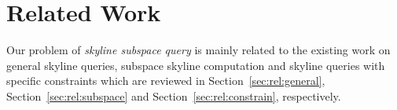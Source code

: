 
%
%

\chapter{Related Work}
\label {ch:related-work}

Our problem of \emph{skyline subspace query} is mainly related to the existing work on general skyline queries, subspace skyline computation and skyline queries with specific constraints which are reviewed in Section~\ref{sec:rel:general}, Section~\ref{sec:rel:subspace} and Section~\ref{sec:rel:constrain}, respectively.

